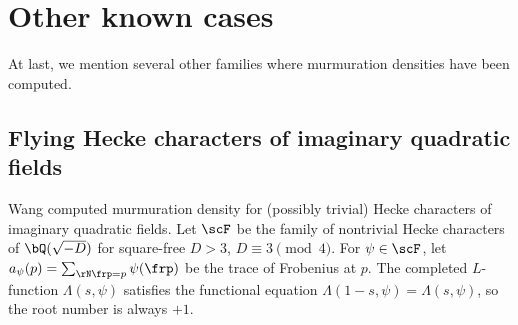 \section{Other known cases}
\label{sec:other}

At last, we mention several other families where murmuration densities have been computed.

\subsection{Flying Hecke characters of imaginary quadratic fields}

Wang \cite{wang2025murmurations} computed murmuration density for (possibly trivial) Hecke characters of imaginary quadratic fields.
Let $\scF$ be the family of nontrivial Hecke characters of $\bQ(\sqrt{-D})$ for square-free $D > 3$, $D \equiv 3 \pmod{4}$.
For $\psi \in \scF$, let $a_\psi(p) = \sum_{\rN\frp = p} \psi(\frp)$ be the trace of Frobenius at $p$.
The completed $L$-function $\Lambda(s, \psi)$ satisfies the functional equation $\Lambda(1 - s, \psi) = \Lambda(s, \psi)$, so the root number is always $+1$.

